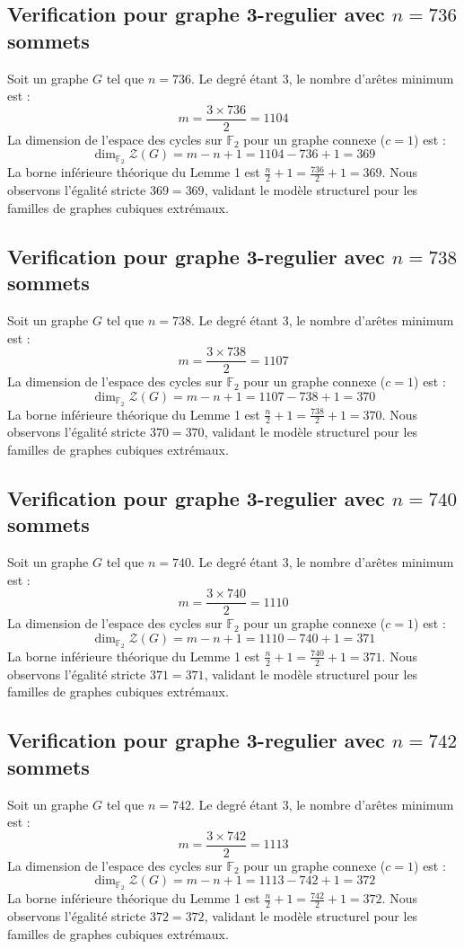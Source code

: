 \documentclass[11pt,a4paper]{article}
\begin{document}
\subsection{Verification pour graphe 3-regulier avec $n=736$ sommets}
Soit un graphe $G$ tel que $n = 736$. Le degré étant 3, le nombre d'arêtes minimum est :
$$ m = \frac{3 \times 736}{2} = 1104 $$
La dimension de l'espace des cycles sur $\mathbb{F}_2$ pour un graphe connexe ($c=1$) est :
$$ \dim_{\mathbb{F}_2} \mathcal{Z}(G) = m - n + 1 = 1104 - 736 + 1 = 369 $$
La borne inférieure théorique du Lemme 1 est $\frac{n}{2} + 1 = \frac{736}{2} + 1 = 369$.
Nous observons l'égalité stricte $369 = 369$, validant le modèle structurel pour les familles de graphes cubiques extrémaux.

\subsection{Verification pour graphe 3-regulier avec $n=738$ sommets}
Soit un graphe $G$ tel que $n = 738$. Le degré étant 3, le nombre d'arêtes minimum est :
$$ m = \frac{3 \times 738}{2} = 1107 $$
La dimension de l'espace des cycles sur $\mathbb{F}_2$ pour un graphe connexe ($c=1$) est :
$$ \dim_{\mathbb{F}_2} \mathcal{Z}(G) = m - n + 1 = 1107 - 738 + 1 = 370 $$
La borne inférieure théorique du Lemme 1 est $\frac{n}{2} + 1 = \frac{738}{2} + 1 = 370$.
Nous observons l'égalité stricte $370 = 370$, validant le modèle structurel pour les familles de graphes cubiques extrémaux.

\subsection{Verification pour graphe 3-regulier avec $n=740$ sommets}
Soit un graphe $G$ tel que $n = 740$. Le degré étant 3, le nombre d'arêtes minimum est :
$$ m = \frac{3 \times 740}{2} = 1110 $$
La dimension de l'espace des cycles sur $\mathbb{F}_2$ pour un graphe connexe ($c=1$) est :
$$ \dim_{\mathbb{F}_2} \mathcal{Z}(G) = m - n + 1 = 1110 - 740 + 1 = 371 $$
La borne inférieure théorique du Lemme 1 est $\frac{n}{2} + 1 = \frac{740}{2} + 1 = 371$.
Nous observons l'égalité stricte $371 = 371$, validant le modèle structurel pour les familles de graphes cubiques extrémaux.

\subsection{Verification pour graphe 3-regulier avec $n=742$ sommets}
Soit un graphe $G$ tel que $n = 742$. Le degré étant 3, le nombre d'arêtes minimum est :
$$ m = \frac{3 \times 742}{2} = 1113 $$
La dimension de l'espace des cycles sur $\mathbb{F}_2$ pour un graphe connexe ($c=1$) est :
$$ \dim_{\mathbb{F}_2} \mathcal{Z}(G) = m - n + 1 = 1113 - 742 + 1 = 372 $$
La borne inférieure théorique du Lemme 1 est $\frac{n}{2} + 1 = \frac{742}{2} + 1 = 372$.
Nous observons l'égalité stricte $372 = 372$, validant le modèle structurel pour les familles de graphes cubiques extrémaux.
\end{document}
